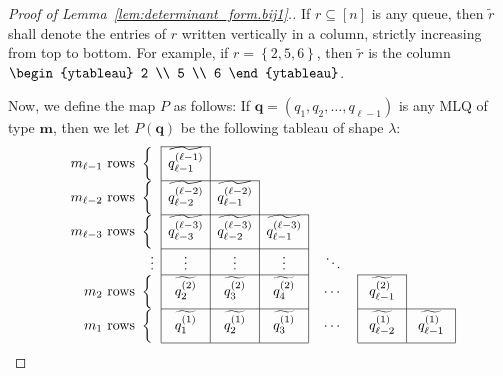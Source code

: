\documentclass[reqno]{amsart}
\newcommand{\0}{\phantom{c}}
\newcommand{\mm}{\mathbf{m}}
\newcommand{\qq}{\mathbf{q}}
\newcommand{\set}[1]{\left\{ #1 \right\}}
\newcommand{\tup}[1]{\left( #1 \right)}
\newcommand{\ive}[1]{\left[ #1 \right]}
\theoremstyle{plain}
\theoremstyle{definition}
\numberwithin{equation}{section}
\begin{document}
\begin{proof}[Proof of Lemma~\ref{lem:determinant_form.bij1}.]
If $r \subseteq \ive{n}$ is any queue, then $\widetilde{r}$ shall denote the entries of $r$ written vertically in a column, strictly increasing from top to bottom.
For example, if $r = \set{2,5,6}$, then $\widetilde{r}$ is the column $\begin{ytableau} 2 \\ 5 \\ 6 \end{ytableau}$.

Now, we define the map $P$ as follows: If $\qq = \tup{q_1, q_2, \dotsc, q_{\ell-1}}$ is any MLQ of type $\mm$, then we let $P(\qq)$ be the following tableau of shape $\lambda$:
\begin{equation}
\label{pf.lem:determinant_form.bij1.visual}
\begin{array}[c]{r|c|ccc@{\hspace{30pt}}c@{\hspace{35pt}}c@{\hspace{35pt}}}
\cline{2-2}%
m_{\ell-1} \text{ rows } \left\{ \vphantom{\dfrac{2^2}{2^2}}\right.
    & \widetilde{q_{\ell-1}^{(\ell-1)}} &  &  &  &  & \\\cline{2-3}
m_{\ell-2} \text{ rows } \left\{ \vphantom{\dfrac{2^2}{2^2}}\right.
    & \widetilde{q_{\ell-2}^{(\ell-2)}} & \widetilde{q_{\ell-1}^{(\ell-2)}} & \multicolumn{1}{|c}{} &  &  & \\\cline{2-4}
m_{\ell-3} \text{ rows } \left\{  \vphantom{\dfrac{2^2}{2^2}}\right.
    & \widetilde{q_{\ell-3}^{(\ell-3)}} & \widetilde{q_{\ell-2}^{(\ell-3)}} & \multicolumn{1}{|c}{\widetilde{q_{\ell-1}^{(  \ell-3)}}} & \multicolumn{1}{|c}{} &  & \\\cline{2-4}%
\vdots & \mathbf{\vdots} & \mathbf{\vdots} & \multicolumn{1}{|c}{\vdots} & \multicolumn{1}{|c}{\ddots} &  & \\\cline{2-4}\cline{6-6}
m_2 \text{ rows } \left\{  \vphantom{\dfrac{2^2}{2^2}}\right.
    & \widetilde{q_2^{(2)}} & \widetilde{q_{3}^{(2)}} & \multicolumn{1}{|c}{\widetilde{q_{4}^{(2)}}} & \multicolumn{1}{|c}{\cdots} & \multicolumn{1}{|c}{\widetilde{q_{\ell-1}^{(2)}}} & \multicolumn{1}{|c}{}\\\cline{2-4}\cline{6-7}
m_1 \text{ rows } \left\{ \vphantom{\dfrac{2^2}{2^2}}\right.
    & \widetilde{q_1^{(1)}} & \widetilde{q_2^{(1)}} & \multicolumn{1}{|c}{\widetilde{q_{3}^{(1)}}} & \multicolumn{1}{|c}{\cdots} & \multicolumn{1}{|c}{\widetilde{q_{\ell-2}^{(1)}}} & \multicolumn{1}{|c|}{\widetilde{q_{\ell-1}^{(1)}}}\\\cline{2-4}\cline{6-7}

\end{array}
\end{equation}
\end{proof}
\end{document}
